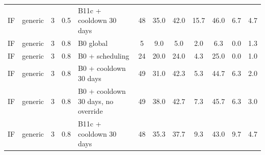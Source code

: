 \documentclass[10pt,onecolumn,letterpaper]{article}
\begin{document}
\begin{longtable}{lllllccccccc}
IF & generic & 3 & 0.5 & B11c + cooldown 30 days & 48 & 35.0 & 42.0 & 15.7 & 46.0 & 6.7 & 4.7 \\
IF & generic & 3 & 0.8 & B0 global & 5 & 9.0 & 5.0 & 2.0 & 6.3 & 0.0 & 1.3 \\
IF & generic & 3 & 0.8 & B0 + scheduling & 24 & 20.0 & 24.0 & 4.3 & 25.0 & 0.0 & 1.0 \\
IF & generic & 3 & 0.8 & B0 + cooldown 30 days & 49 & 31.0 & 42.3 & 5.3 & 44.7 & 6.3 & 2.0 \\
IF & generic & 3 & 0.8 & B0 + cooldown 30 days, no override & 49 & 38.0 & 42.7 & 7.3 & 45.7 & 6.3 & 3.0 \\
IF & generic & 3 & 0.8 & B11c + cooldown 30 days & 48 & 35.3 & 37.7 & 9.3 & 43.0 & 9.7 & 4.7 \\
\bottomrule
\end{longtable}
\end{document}
